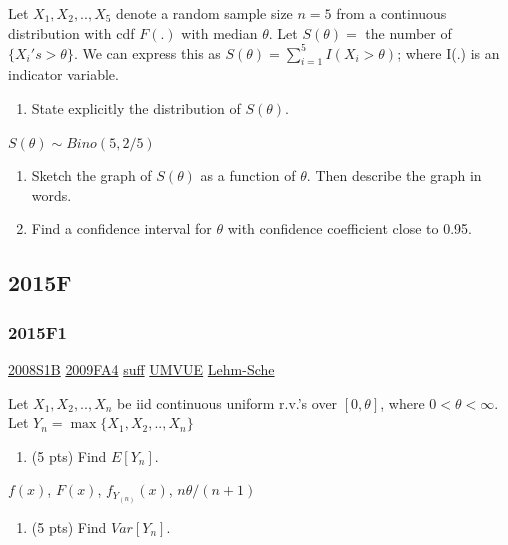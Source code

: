 \documentclass[10pt,twocolumn,portrait]{article}
\providecommand{\tightlist}{%
  \setlength{\itemsep}{0pt}\setlength{\parskip}{0pt}}
\begin{document}
Let \(X_1,X_2,..,X_{5}\) denote a random sample size \(n=5\) from a
continuous distribution with cdf \(F(.)\) with median \(\theta\). Let
\(S(\theta)=\) the number of \(\{X_i's>\theta\}\). We can express this
as \(S(\theta)=\sum_{i=1}^5I(X_i>\theta)\); where I(.) is an indicator
variable.

\begin{enumerate}
\def\labelenumi{(\alph{enumi})}
\tightlist
\item
  State explicitly the distribution of \(S(\theta)\).
\end{enumerate}

\(S(\theta)\sim Bino(5,2/5)\)

\begin{enumerate}
\def\labelenumi{(\alph{enumi})}
\setcounter{enumi}{1}
\item
  Sketch the graph of \(S(\theta)\) as a function of \(\theta\). Then
  describe the graph in words.
\item
  Find a confidence interval for \(\theta\) with confidence coefficient
  close to 0.95.
\end{enumerate}

\hypertarget{f-10}{%
\subsection{2015F}\label{f-10}}

\hypertarget{f1-5}{%
\subsubsection{2015F1}\label{f1-5}}

\protect\hyperlink{s1b}{2008S1B} \protect\hyperlink{fa4}{2009FA4}
\protect\hyperlink{section-6}{suff} \protect\hyperlink{section-5}{UMVUE}
\protect\hyperlink{Lehm-Sche}{Lehm-Sche}

Let \(X_1,X_2,..,X_{n}\) be iid continuous uniform r.v.'s over
\([0,\theta]\), where \(0 <\theta<\infty\). Let
\(Y_{n}=\max\{X_1,X_2,..,X_{n}\}\)

\begin{enumerate}
\def\labelenumi{(\alph{enumi})}
\tightlist
\item
  (5 pts) Find \(E[Y_n]\).
\end{enumerate}

\(f(x)\), \(F(x)\), \(f_{Y_{(n)}}(x)\), \(n\theta/(n+1)\)

\begin{enumerate}
\def\labelenumi{(\alph{enumi})}
\setcounter{enumi}{1}
\tightlist
\item
  (5 pts) Find \(Var[Y_n]\).
\end{enumerate}
\end{document}
